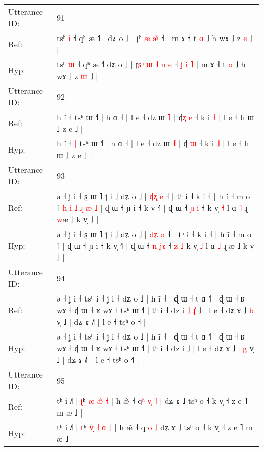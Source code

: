 \documentclass[10pt]{article}
\DeclareRobustCommand{\hl}[1]{{\textcolor{red}{#1}}}
\begin{document}
\begin{longtable}{ll}
\midrule
Utterance ID: & 91 \\
Ref: & tsʰ \hl{i} ˧ qʰ æ ˧˥\hl{ }\hl{|} dʑ o ˩ | ʈ\hl{}ʰ\hl{}\hl{} \hl{æ} \hl{}\hl{æ}\hl{̃} ˧\hl{}\hl{}\hl{}\hl{}\hl{}\hl{} | m ɤ ˧ t \hl{ɑ} ˩ h wɤ ˩ z \hl{e} ˩ |
 \\
Hyp: & tsʰ \hl{ɯ} ˧ qʰ æ ˧˥\hl{}\hl{} dʑ o ˩ | ʈ\hl{ʂ}ʰ\hl{ }\hl{ɯ} \hl{˧} \hl{n}\hl{ }\hl{e} ˧\hl{ }\hl{ʝ}\hl{ }\hl{i}\hl{ }\hl{˥} | m ɤ ˧ t \hl{o} ˩ h wɤ ˩ z \hl{ɯ} ˩ |
 \\
\midrule
Utterance ID: & 92 \\
Ref: & h ĩ ˧\hl{}\hl{} tsʰ ɯ ˧˥ | h ɑ ˧ | l e ˧ dz ɯ \hl{˥} | ɖ\hl{ʐ} \hl{e} ˧ k i \hl{˧} | l e ˧ h ɯ ˩ z e ˩ |
 \\
Hyp: & h ĩ ˧\hl{ }\hl{|} tsʰ ɯ ˧˥ | h ɑ ˧ | l e ˧ dz ɯ \hl{˧} | ɖ\hl{} \hl{ɯ} ˧ k i \hl{˩} | l e ˧ h ɯ ˩ z e ˩ |
 \\
\midrule
Utterance ID: & 93 \\
Ref: & ə ˧ ʝ i ˧ ʂ ɯ ˥ ʝ i ˩ dʑ o ˩ | \hl{ɖ}\hl{ʐ} \hl{e} ˧ | tʰ i ˧ k i ˧ | h ĩ ˧ m o ˥\hl{ }\hl{h}\hl{ }\hl{i}\hl{̃}\hl{ }\hl{˩}\hl{ }\hl{ɻ}\hl{ }\hl{æ}\hl{ }\hl{˩} | ɖ ɯ ˧ ɲ i ˧ k v̩ ˧˥ | ɖ ɯ ˧ \hl{ɲ} \hl{}\hl{i} ˧\hl{}\hl{}\hl{}\hl{} k v̩ \hl{˧} l ɑ \hl{˥} ɻ \hl{w}æ ˩ k v̩ ˩ |
 \\
Hyp: & ə ˧ ʝ i ˧ ʂ ɯ ˥ ʝ i ˩ dʑ o ˩ | \hl{d}\hl{ʑ} \hl{o} ˧ | tʰ i ˧ k i ˧ | h ĩ ˧ m o ˥\hl{}\hl{}\hl{}\hl{}\hl{}\hl{}\hl{}\hl{}\hl{}\hl{}\hl{}\hl{}\hl{} | ɖ ɯ ˧ ɲ i ˧ k v̩ ˧˥ | ɖ ɯ ˧ \hl{n} \hl{j}\hl{ɤ} ˧\hl{ }\hl{z}\hl{ }\hl{˩} k v̩ \hl{˩} l ɑ \hl{˩} ɻ \hl{}æ ˩ k v̩ ˩ |
 \\
\midrule
Utterance ID: & 94 \\
Ref: & ə ˧ ʝ i ˧ tsʰ i ˧ ʝ i ˧ dʑ o ˩ | h ĩ ˧ | ɖ ɯ ˧ t ɑ ˧˥ | ɖ ɯ ˧ ʁ wɤ ˧ ɖ ɯ ˧ ʁ wɤ ˧ tsʰ ɯ ˧˥ | tʰ i ˧ dz i\hl{ }\hl{˩}\hl{ }\hl{ɻ}\hl{̍} ˩ | l e ˧ dʑ ɤ ˩\hl{}\hl{} \hl{b} v̩ ˩ | dʑ ɤ ˩˥ | l e ˧ tsʰ o ˧\hl{} |
 \\
Hyp: & ə ˧ ʝ i ˧ tsʰ i ˧ ʝ i ˧ dʑ o ˩ | h ĩ ˧ | ɖ ɯ ˧ t ɑ ˧˥ | ɖ ɯ ˧ ʁ wɤ ˧ ɖ ɯ ˧ ʁ wɤ ˧ tsʰ ɯ ˧˥ | tʰ i ˧ dz i\hl{}\hl{}\hl{}\hl{}\hl{} ˩ | l e ˧ dʑ ɤ ˩\hl{ }\hl{|} \hl{g} v̩ ˩ | dʑ ɤ ˩˥ | l e ˧ tsʰ o ˧\hl{˥} |
 \\
\midrule
Utterance ID: & 95 \\
Ref: & tʰ i ˩˥ | \hl{ʈ}ʰ \hl{}\hl{æ} \hl{}\hl{æ}\hl{̃} \hl{˧} | h æ̃ ˧ q\hl{ʰ}\hl{ }\hl{v}\hl{̩} \hl{˥} \hl{|} dʑ ɤ ˩ tsʰ o ˧ k v̩ ˧ z e ˥ m æ ˩ |
 \\
Hyp: & tʰ i ˩˥ | \hl{t}ʰ \hl{v}\hl{̩} \hl{˧}\hl{ }\hl{ɑ} \hl{˩} | h æ̃ ˧ q\hl{}\hl{}\hl{}\hl{} \hl{o} \hl{˩} dʑ ɤ ˩ tsʰ o ˧ k v̩ ˧ z e ˥ m æ ˩ |
 \\

\end{longtable}
\end{document}
